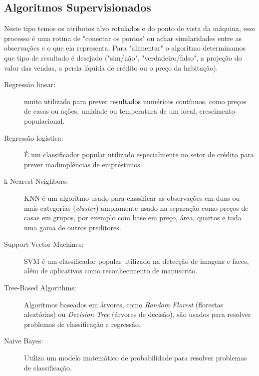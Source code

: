 \subsection{Algoritmos Supervisionados}
Neste tipo temos os atributos alvo rotulados e do ponto de vista da máquina, esse processo é uma rotina de "conectar os pontos" ou achar similaridades entre as observações e o que ela representa. Para "alimentar" o algoritmo determinamos que tipo de resultado é desejado ("sim/não", "verdadeiro/falso", a projeção do valor das vendas, a perda líquida de crédito ou o preço da habitação).
\begin{description}
	\item[Regressão linear:] muito utilizado para prever resultados numéricos contínuos, como preços de casas ou ações, umidade ou temperatura de um local, crescimento populacional.
	\item[Regressão logística:] É um classificador popular utilizado especialmente no setor de crédito para prever inadimplências de empréstimos.
	\item[k-Nearest Neighbors:] KNN é um algoritmo usado para classificar as observações em duas ou mais categorias (\textit{cluster}) amplamente usado na separação como preços de casas em grupos, por exemplo com base em preço, área, quartos e toda uma gama de outros preditores.
	\item[Support Vector Machines:] SVM é um classificador popular utilizado na detecção de imagens e faces, além de aplicativos como reconhecimento de manuscrito.
	\item[Tree-Based Algorithms:] Algoritmos baseados em árvores, como \textit{Random Florest} (florestas aleatórias) ou \textit{Decision Tree} (árvores de decisão), são usados para resolver problemas de classificação e regressão.
	\item[Naive Bayes:] Utiliza um modelo matemático de probabilidade para resolver problemas de classificação.
\end{description}

